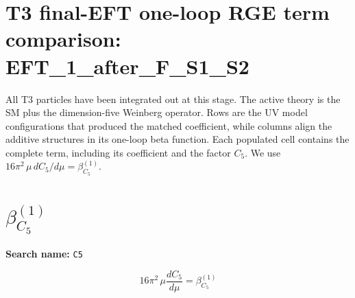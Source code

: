 \documentclass[8pt]{article}
\begin{document}
\begin{landscape}
\section*{T3 final-EFT one-loop RGE term comparison: EFT\_1\_after\_F\_S1\_S2}
All T3 particles have been integrated out at this stage. The active theory is the SM plus the dimension-five Weinberg operator. Rows are the UV model configurations that produced the matched coefficient, while columns align the additive structures in its one-loop beta function. Each populated cell contains the complete term, including its coefficient and the factor $C_5$.
\medskip
We use $16\pi^2\,\mu\,dC_5/d\mu=\beta_{C_5}^{(1)}$.
\section*{$\beta_{C_5}^{(1)}$}
\noindent\textbf{Search name: }\texttt{C5}\par\smallskip
\[16\pi^2\,\mu\frac{dC_5}{d\mu}=\beta_{C_5}^{(1)}\]

\end{landscape}
\end{document}
